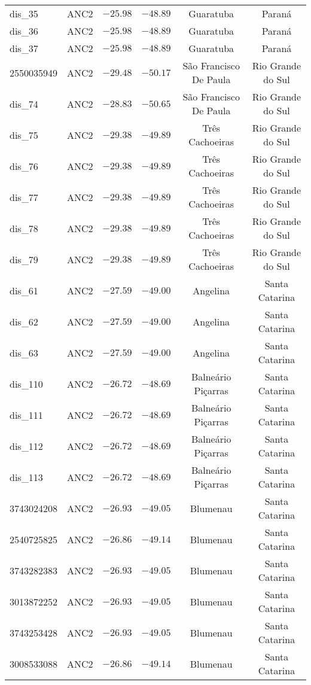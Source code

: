 \begin{longtable}{lccccc}
dis\_35 & ANC2 & $-25.98$ & $-48.89$ & Guaratuba & Paraná \\ 
dis\_36 & ANC2 & $-25.98$ & $-48.89$ & Guaratuba & Paraná \\ 
dis\_37 & ANC2 & $-25.98$ & $-48.89$ & Guaratuba & Paraná \\ 
2550035949 & ANC2 & $-29.48$ & $-50.17$ & São Francisco De Paula & Rio Grande do Sul \\ 
dis\_74 & ANC2 & $-28.83$ & $-50.65$ & São Francisco De Paula & Rio Grande do Sul \\ 
dis\_75 & ANC2 & $-29.38$ & $-49.89$ & Três Cachoeiras & Rio Grande do Sul \\ 
dis\_76 & ANC2 & $-29.38$ & $-49.89$ & Três Cachoeiras & Rio Grande do Sul \\ 
dis\_77 & ANC2 & $-29.38$ & $-49.89$ & Três Cachoeiras & Rio Grande do Sul \\ 
dis\_78 & ANC2 & $-29.38$ & $-49.89$ & Três Cachoeiras & Rio Grande do Sul \\ 
dis\_79 & ANC2 & $-29.38$ & $-49.89$ & Três Cachoeiras & Rio Grande do Sul \\ 
dis\_61 & ANC2 & $-27.59$ & $-49.00$ & Angelina & Santa Catarina \\ 
dis\_62 & ANC2 & $-27.59$ & $-49.00$ & Angelina & Santa Catarina \\ 
dis\_63 & ANC2 & $-27.59$ & $-49.00$ & Angelina & Santa Catarina \\ 
dis\_110 & ANC2 & $-26.72$ & $-48.69$ & Balneário Piçarras & Santa Catarina \\ 
dis\_111 & ANC2 & $-26.72$ & $-48.69$ & Balneário Piçarras & Santa Catarina \\ 
dis\_112 & ANC2 & $-26.72$ & $-48.69$ & Balneário Piçarras & Santa Catarina \\ 
dis\_113 & ANC2 & $-26.72$ & $-48.69$ & Balneário Piçarras & Santa Catarina \\ 
3743024208 & ANC2 & $-26.93$ & $-49.05$ & Blumenau & Santa Catarina \\ 
2540725825 & ANC2 & $-26.86$ & $-49.14$ & Blumenau & Santa Catarina \\ 
3743282383 & ANC2 & $-26.93$ & $-49.05$ & Blumenau & Santa Catarina \\ 
3013872252 & ANC2 & $-26.93$ & $-49.05$ & Blumenau & Santa Catarina \\ 
3743253428 & ANC2 & $-26.93$ & $-49.05$ & Blumenau & Santa Catarina \\ 
3008533088 & ANC2 & $-26.86$ & $-49.14$ & Blumenau & Santa Catarina \\ 

\end{longtable}
